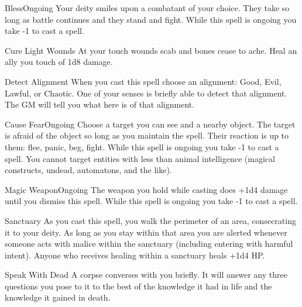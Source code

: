 \documentclass[8pt]{extarticle}
\begin{document}
\begin{multicols}{2}
  \begin{aspell}{Bless}{Ongoing}
    Your deity smiles upon a combatant of your choice. They take
     so long as battle continues and they stand and
    fight. While this spell is ongoing you take -1 to cast a spell.
  \end{aspell}

  \begin{aspell}{Cure Light Wounds}{}
    At your touch wounds scab and bones cease to ache. Heal an ally
    you touch of 1d8 damage.
  \end{aspell}

  \begin{aspell}{Detect Alignment}{}
    When you cast this spell choose an alignment: Good, Evil, Lawful,
    or Chaotic. One of your senses is briefly able to detect that
    alignment. The GM will tell you what here is of that alignment.
  \end{aspell}

  \begin{aspell}{Cause Fear}{Ongoing}
    Choose a target you can see and a nearby object. The target is
    afraid of the object so long as you maintain the spell. Their
    reaction is up to them: flee, panic, beg, fight. While this spell
    is ongoing you take -1 to cast a spell. You cannot target entities
    with less than animal intelligence (magical constructs, undead,
    automatons, and the like).
  \end{aspell}
  \vfill\null
  \columnbreak
  \begin{aspell}{Magic Weapon}{Ongoing}
    The weapon you hold while casting does +1d4 damage until you
    dismiss this spell. While this spell is ongoing you take -1 to
    cast a spell.
  \end{aspell}

  \begin{aspell}{Sanctuary}{}
    As you cast this spell, you walk the perimeter of an area,
    consecrating it to your deity. As long as you stay within that
    area you are alerted whenever someone acts with malice within the
    sanctuary (including entering with harmful intent).  Anyone who
    receives healing within a sanctuary heals +1d4 HP.
  \end{aspell}

  \begin{aspell}{Speak With Dead}{}
    A corpse converses with you briefly. It will answer any three
    questions you pose to it to the best of the knowledge it had in
    life and the knowledge it gained in death.
  \end{aspell}
  \vfill\null
\end{multicols}
\end{document}
